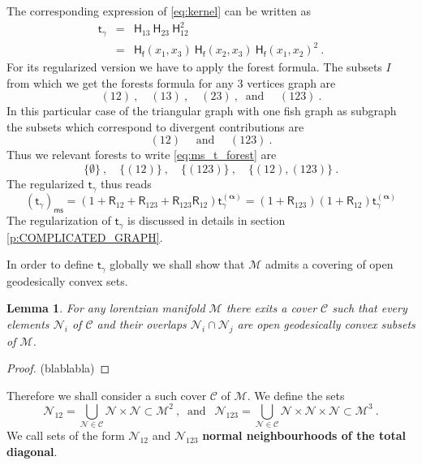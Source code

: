 \documentclass[11pt]{book}
\newcommand{\ms}{\mathsf{ms}}
\newcommand{\alphabd}{\boldsymbol{\alpha}}
\newcommand{\Ccal}{\mathcal{C}}
\newcommand{\Mcal}{\mathcal{M}}
\newcommand{\Ncal}{\mathcal{N}}
\newcommand{\Hsf}{\mathsf{H}}
\newcommand{\Rsf}{\mathsf{R}}
\newcommand{\fsf}{\mathsf{f}}
\newcommand{\tsf}{\mathsf{t}}
\theoremstyle{break}
\newtheorem{lemma}{Lemma}[chapter]
\begin{document}
The corresponding expression of \ref{eq:kernel} can be written as 
%
\begin{eqnarray*}
\tsf_\gamma &=& \Hsf_{13} \ \Hsf_{23} \ \Hsf_{12}^2 \\
&=& \Hsf_\fsf(x_1,x_3) \ \Hsf_\fsf(x_2,x_3) \ \Hsf_\fsf(x_1,x_2)^2 \ .
\end{eqnarray*}
%
For its regularized version we have to apply the forest formula. The subsets $I$ from which we get the forests formula for any $3$ vertices graph are
%
\begin{equation*}
(12) \ , \quad (13) \ , \quad (23) \ , \ \mbox{ and } \quad (123) \ .
\end{equation*}
%
In this particular case of the triangular graph with one fish graph as subgraph the subsets which correspond to divergent contributions are 
%
\begin{equation*}
(12) \quad \mbox{ and } \quad (123) \ .
\end{equation*}
%
Thus we relevant forests to write \eqref{eq:ms_t_forest} are 
%
\begin{equation*}
\{\emptyset\} \ , \quad \{(12)\} \ , \quad \{(123)\} \ , \quad \{(12),(123)\} \ .
\end{equation*} 
%
The regularized $\tsf_\gamma$ thus reads
\begin{equation}
\left(\tsf_\gamma\right)_\ms = \left(1+\Rsf_{12}+\Rsf_{123}+\Rsf_{123}\Rsf_{12}\right) \tsf^{(\alphabd)}_\gamma = (1+\Rsf_{123})(1+\Rsf_{12}) \tsf^{(\alphabd)}_\gamma
\label{eq:kernel_trig_ms}
\end{equation}
The regularization of $\tsf_\gamma$ is discussed in details in section \ref{p:COMPLICATED_GRAPH}. 


In order to define $\tsf_\gamma$ globally we shall show that $\Mcal$ admits a covering of open geodesically convex sets.


\begin{lemma}
For any lorentzian manifold $\Mcal$ there exits a cover $\Ccal$ such that every elements $\Ncal_i$ of $\Ccal$ and their overlaps $\Ncal_i \cap \Ncal_j$ are open geodesically convex subsets of $\Mcal$.
\end{lemma}


\begin{proof}
(blablabla)
\end{proof}


Therefore we shall consider a such cover $\Ccal$ of $\Mcal$. We define the sets
%
\begin{equation}
\Ncal_{12} = \bigcup_{\Ncal\in\Ccal} \Ncal \times \Ncal \subset \Mcal^2 \ , \ \mbox{ and } \ \  \Ncal_{123} = \bigcup_{\Ncal\in\Ccal} \Ncal \times \Ncal\times \Ncal \subset \Mcal^3 \ . 
\label{eq:neighborhood_glob}
\end{equation}
%
We call sets of the form $\Ncal_{12}$ and $\Ncal_{123}$ \textbf{normal neighbourhoods of the total diagonal}. 
\end{document}
